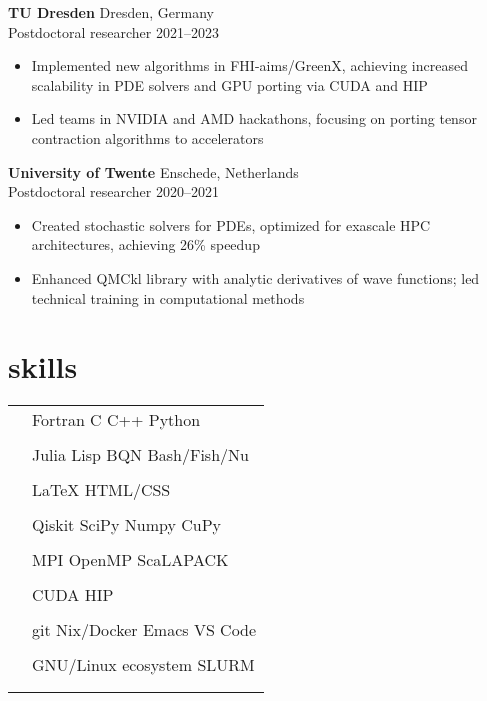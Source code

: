 \documentclass[12pt]{article}
\newcommand{\entry}[4]{{{\textbf{#1}}} \hfill #3 \\ #2 \hfill #4}
\newcommand{\tableentry}[3]{\textsc{#1} & #2\expandafter\ifstrequal\expandafter{#3}{}{\\}{\\[6pt]}}
\begin{document}
\begin{paracol}{2}
    \entry{TU Dresden}{Postdoctoral researcher}{Dresden, Germany}{2021--2023}
    \begin{itemize}[noitemsep,leftmargin=3.5mm,rightmargin=0mm,topsep=6pt]
    \item Implemented new algorithms in FHI-aims/GreenX, achieving increased scalability in PDE solvers and GPU porting via CUDA and HIP
    \item Led teams in NVIDIA and AMD hackathons, focusing on porting tensor contraction algorithms to accelerators
    \end{itemize}

    \entry{University of Twente}{Postdoctoral researcher}{Enschede, Netherlands}{2020--2021}
    \begin{itemize}[noitemsep,leftmargin=3.5mm,rightmargin=0mm,topsep=6pt]
    \item Created stochastic solvers for PDEs, optimized for exascale HPC architectures, achieving 26\% speedup
    \item Enhanced QMCkl library with analytic derivatives of wave functions; led technical training in computational methods
    \end{itemize}


    \switchcolumn{}

    \section{skills}
    \begin{supertabular}{rl}
      \tableentry{\footnotesize\faCode}{Fortran \textperiodcentered{} C
        \textperiodcentered{} C++ \textperiodcentered{} Python}{}
      \tableentry{}{Julia \textperiodcentered{} Lisp \textperiodcentered{} BQN \textperiodcentered{} Bash/Fish/Nu}{}
      \tableentry{}{LaTeX \textperiodcentered{} HTML/CSS}{}
      \tableentry{\footnotesize\faCogs}{Qiskit \textperiodcentered{} SciPy \textperiodcentered{} Numpy \textperiodcentered{} CuPy}{}
      \tableentry{}{MPI \textperiodcentered{} OpenMP \textperiodcentered{} ScaLAPACK}{}
      \tableentry{}{CUDA \textperiodcentered{} HIP}{}
      \tableentry{\footnotesize\faLaptop}{git \textperiodcentered{} Nix/Docker \textperiodcentered{}  Emacs \textperiodcentered{} VS Code}{}
      \tableentry{}{GNU/Linux ecosystem \textperiodcentered{} SLURM}{}


\end{supertabular}
\end{paracol}
\end{document}
